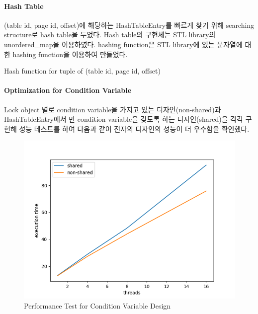 \documentclass[main.tex]{subfiles}
\begin{document}
\paragraph{Hash Table}
(table id, page id, offset)에 해당하는 HashTableEntry를 빠르게 찾기 위해 searching structure로 hash table을 두었다. Hash table의 구현체는 STL library의 unordered\_map을 이용하였다.
hashing function은 STL library에 있는 문자열에 대한 hashing function을 이용하여 만들었다.

\begin{algorithm}
	\caption{Hash function for tuple of (table id, page id, offset)}
	
	\begin{algorithmic}[lines]
		\State {}
		\EndFunction
	\end{algorithmic}
\end{algorithm}

\paragraph{Optimization for Condition Variable}
Lock object 별로 condition variable을 가지고 있는 디자인(non-shared)과 HashTableEntry에서 만 condition variable을 갖도록 하는 디자인(shared)을 각각 구현해 성능 테스트를 하여 다음과 같이 전자의 디자인의 성능이 더 우수함을 확인했다.

\begin{figure}[!hbt]
	\centering
	\includegraphics[width=.8\textwidth]{images/cc/cond_var_design.png}
	\caption{Performance Test for Condition Variable Design}
\end{figure}
\end{document}
